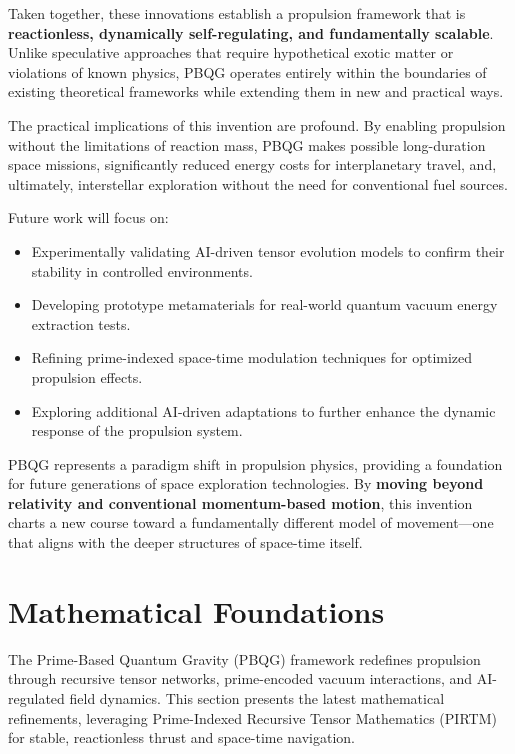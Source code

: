 \documentclass{article}
\theoremstyle{plain}
\begin{document}
Taken together, these innovations establish a propulsion framework that is \textbf{reactionless, dynamically self-regulating, and fundamentally scalable}. Unlike speculative approaches that require hypothetical exotic matter or violations of known physics, PBQG operates entirely within the boundaries of existing theoretical frameworks while extending them in new and practical ways. 

The practical implications of this invention are profound. By enabling propulsion without the limitations of reaction mass, PBQG makes possible long-duration space missions, significantly reduced energy costs for interplanetary travel, and, ultimately, interstellar exploration without the need for conventional fuel sources. 

Future work will focus on:
\begin{itemize}
    \item Experimentally validating AI-driven tensor evolution models to confirm their stability in controlled environments.
    \item Developing prototype metamaterials for real-world quantum vacuum energy extraction tests.
    \item Refining prime-indexed space-time modulation techniques for optimized propulsion effects.
    \item Exploring additional AI-driven adaptations to further enhance the dynamic response of the propulsion system.
\end{itemize}

PBQG represents a paradigm shift in propulsion physics, providing a foundation for future generations of space exploration technologies. By \textbf{moving beyond relativity and conventional momentum-based motion}, this invention charts a new course toward a fundamentally different model of movement—one that aligns with the deeper structures of space-time itself.

\section{Mathematical Foundations}
The Prime-Based Quantum Gravity (PBQG) framework redefines propulsion through recursive tensor networks, prime-encoded vacuum interactions, and AI-regulated field dynamics. This section presents the latest mathematical refinements, leveraging Prime-Indexed Recursive Tensor Mathematics (PIRTM) for stable, reactionless thrust and space-time navigation.
\end{document}
